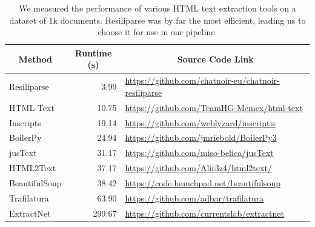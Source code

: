 \begin{table}[t]
\begin{center}
\begin{tabular}{lrl}
\multicolumn{1}{c}{\bf Method}  &\multicolumn{1}{c}{\bf Runtime (s)} &\multicolumn{1}{c}{\bf Source Code Link} \\
\midrule
Resiliparse & 3.99 & \href{https://github.com/chatnoir-eu/chatnoir-resiliparse}{https://github.com/chatnoir-eu/chatnoir-resiliparse} \\
HTML-Text & 10.75 & \href{https://github.com/TeamHG-Memex/html-text}{https://github.com/TeamHG-Memex/html-text} \\
Inscripts & 19.14 & \href{https://github.com/weblyzard/inscriptis}{https://github.com/weblyzard/inscriptis} \\
BoilerPy & 24.94 & \href{https://github.com/jmriebold/BoilerPy3}{https://github.com/jmriebold/BoilerPy3} \\
jusText & 31.17 & \href{https://github.com/miso-belica/jusText}{https://github.com/miso-belica/jusText} \\
HTML2Text & 37.17 & \href{https://github.com/Alir3z4/html2text/}{https://github.com/Alir3z4/html2text/} \\
BeautifulSoup & 38.42 & \href{https://code.launchpad.net/beautifulsoup}{https://code.launchpad.net/beautifulsoup} \\
Trafilatura & 63.90 & \href{https://github.com/adbar/trafilatura}{https://github.com/adbar/trafilatura} \\
ExtractNet & 299.67 & \href{https://github.com/currentslab/extractnet}{https://github.com/currentslab/extractnet} \\
\end{tabular}
\end{center}
\caption{We measured the performance of various HTML text extraction tools on a dataset of 1k documents. Resiliparse was by far the most efficient, leading us to choose it for use in our pipeline.}
\label{table:extraction-methods-comparison}
\end{table}
